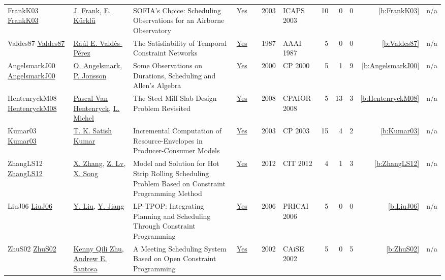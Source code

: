 {\begin{longtable}{>{\raggedright\arraybackslash}p{3cm}>{\raggedright\arraybackslash}p{6cm}>{\raggedright\arraybackslash}p{6.5cm}rrrp{2.5cm}rrrrr}
FrankK03 \href{http://www.aaai.org/Library/ICAPS/2003/icaps03-023.php}{FrankK03} & \hyperref[auth:a382]{J. Frank}, \hyperref[auth:a383]{E. K{\"{u}}rkl{\"{u}}} & SOFIA's Choice: Scheduling Observations for an Airborne Observatory & \href{../works/FrankK03.pdf}{Yes} & \cite{FrankK03} & 2003 & ICAPS 2003 & 10 & 0 & 0 & \ref{b:FrankK03} & n/a\\
Valdes87 \href{http://www.aaai.org/Library/AAAI/1987/aaai87-046.php}{Valdes87} & \hyperref[auth:a1296]{Ra{\'{u}}l E. Vald{\'{e}}s{-}P{\'{e}}rez} & The Satisfiability of Temporal Constraint Networks & \href{../works/Valdes87.pdf}{Yes} & \cite{Valdes87} & 1987 & AAAI 1987 & 5 & 0 & 0 & \ref{b:Valdes87} & n/a\\
AngelsmarkJ00 \href{https://doi.org/10.1007/3-540-45349-0_35}{AngelsmarkJ00} & \hyperref[auth:a297]{O. Angelsmark}, \hyperref[auth:a298]{P. Jonsson} & Some Observations on Durations, Scheduling and Allen's Algebra & \href{../works/AngelsmarkJ00.pdf}{Yes} & \cite{AngelsmarkJ00} & 2000 & CP 2000 & 5 & 1 & 9 & \ref{b:AngelsmarkJ00} & n/a\\
HentenryckM08 \href{https://doi.org/10.1007/978-3-540-68155-7_41}{HentenryckM08} & \hyperref[auth:a149]{Pascal Van Hentenryck}, \hyperref[auth:a32]{L. Michel} & The Steel Mill Slab Design Problem Revisited & \href{../works/HentenryckM08.pdf}{Yes} & \cite{HentenryckM08} & 2008 & CPAIOR 2008 & 5 & 13 & 3 & \ref{b:HentenryckM08} & n/a\\
Kumar03 \href{https://doi.org/10.1007/978-3-540-45193-8_45}{Kumar03} & \hyperref[auth:a288]{T. K. Satish Kumar} & Incremental Computation of Resource-Envelopes in Producer-Consumer Models & \href{../works/Kumar03.pdf}{Yes} & \cite{Kumar03} & 2003 & CP 2003 & 15 & 4 & 2 & \ref{b:Kumar03} & n/a\\
ZhangLS12 \href{https://doi.org/10.1109/CIT.2012.96}{ZhangLS12} & \hyperref[auth:a617]{X. Zhang}, \hyperref[auth:a618]{Z. Lv}, \hyperref[auth:a619]{X. Song} & Model and Solution for Hot Strip Rolling Scheduling Problem Based on Constraint Programming Method & \href{../works/ZhangLS12.pdf}{Yes} & \cite{ZhangLS12} & 2012 & CIT 2012 & 4 & 1 & 3 & \ref{b:ZhangLS12} & n/a\\
LiuJ06 \href{https://doi.org/10.1007/11801603_92}{LiuJ06} & \hyperref[auth:a660]{Y. Liu}, \hyperref[auth:a661]{Y. Jiang} & {LP-TPOP:} Integrating Planning and Scheduling Through Constraint Programming & \href{../works/LiuJ06.pdf}{Yes} & \cite{LiuJ06} & 2006 & PRICAI 2006 & 5 & 0 & 0 & \ref{b:LiuJ06} & n/a\\
ZhuS02 \href{https://doi.org/10.1007/3-540-47961-9_69}{ZhuS02} & \hyperref[auth:a680]{Kenny Qili Zhu}, \hyperref[auth:a681]{Andrew E. Santosa} & A Meeting Scheduling System Based on Open Constraint Programming & \href{../works/ZhuS02.pdf}{Yes} & \cite{ZhuS02} & 2002 & CAiSE 2002 & 5 & 0 & 5 & \ref{b:ZhuS02} & n/a\\

\end{longtable}}
